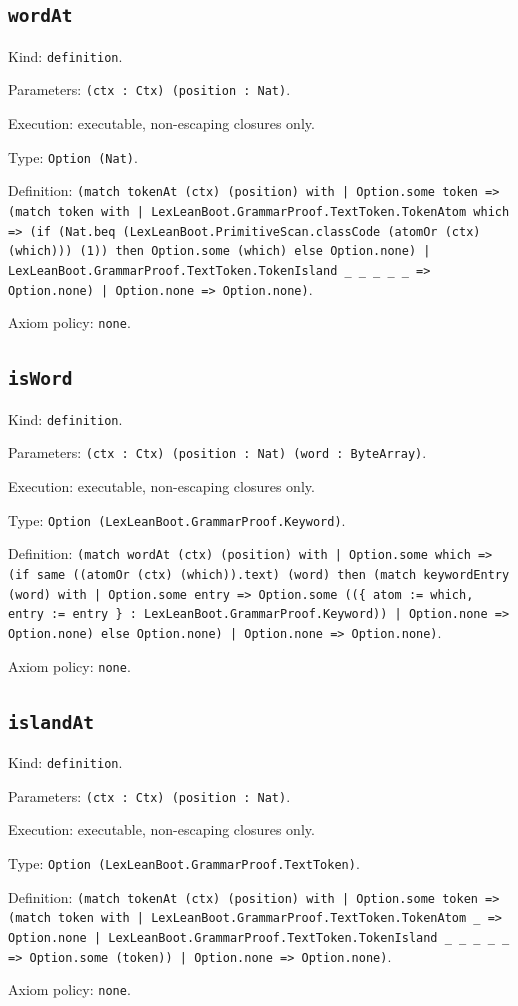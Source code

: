 \documentclass[11pt]{article}
\begin{document}
\subsection*{\texttt{wordAt}}
\noindent Kind: \texttt{definition}.\par
\noindent Parameters: \texttt{(ctx : Ctx) (position : Nat)}.\par
\noindent Execution: executable, non-escaping closures only.\par
\noindent Type: \texttt{Option (Nat)}.\par
\noindent Definition: \texttt{(match tokenAt (ctx) (position) with | Option.some token => (match token with | LexLeanBoot.GrammarProof.TextToken.TokenAtom which => (if (Nat.beq (LexLeanBoot.PrimitiveScan.classCode (atomOr (ctx) (which))) (1)) then Option.some (which) else Option.none) | LexLeanBoot.GrammarProof.TextToken.TokenIsland \_ \_ \_ \_ \_ => Option.none) | Option.none => Option.none)}.\par
\noindent Axiom policy: \texttt{none}.\par
\subsection*{\texttt{isWord}}
\noindent Kind: \texttt{definition}.\par
\noindent Parameters: \texttt{(ctx : Ctx) (position : Nat) (word : ByteArray)}.\par
\noindent Execution: executable, non-escaping closures only.\par
\noindent Type: \texttt{Option (LexLeanBoot.GrammarProof.Keyword)}.\par
\noindent Definition: \texttt{(match wordAt (ctx) (position) with | Option.some which => (if same ((atomOr (ctx) (which)).text) (word) then (match keywordEntry (word) with | Option.some entry => Option.some ((\{ atom := which, entry := entry \} : LexLeanBoot.GrammarProof.Keyword)) | Option.none => Option.none) else Option.none) | Option.none => Option.none)}.\par
\noindent Axiom policy: \texttt{none}.\par
\subsection*{\texttt{islandAt}}
\noindent Kind: \texttt{definition}.\par
\noindent Parameters: \texttt{(ctx : Ctx) (position : Nat)}.\par
\noindent Execution: executable, non-escaping closures only.\par
\noindent Type: \texttt{Option (LexLeanBoot.GrammarProof.TextToken)}.\par
\noindent Definition: \texttt{(match tokenAt (ctx) (position) with | Option.some token => (match token with | LexLeanBoot.GrammarProof.TextToken.TokenAtom \_ => Option.none | LexLeanBoot.GrammarProof.TextToken.TokenIsland \_ \_ \_ \_ \_ => Option.some (token)) | Option.none => Option.none)}.\par
\noindent Axiom policy: \texttt{none}.\par
\end{document}
